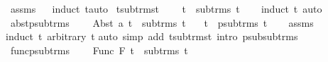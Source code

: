 \begin{isabellebody}
\isamarkupfalse%
\ assms\isanewline
\ \ \isamarkupfalse%
{\isacharparenleft}{\kern0pt}induct\ t{}{\isacharparenright}{\kern0pt}{\isacharparenleft}{\kern0pt}auto{\isacharparenright}{\kern0pt}%
\endisatagproof
{\isafoldproof}%
%
\isadelimproof
\isanewline
%
\endisadelimproof
\isanewline
\isanewline
{}\isamarkupfalse%
\ t{\isacharunderscore}{\kern0pt}sub{\isacharunderscore}{\kern0pt}trms{\isacharunderscore}{\kern0pt}t{\isacharcolon}{\kern0pt}\ \isanewline
\ \ \ {\isachardoublequoteopen}t\ {\isasymin}\ sub{\isacharunderscore}{\kern0pt}trms\ t{\isachardoublequoteclose}\isanewline
%
\isadelimproof
\ \ %
\endisadelimproof
%
\isatagproof
{}\isamarkupfalse%
\ {\isacharparenleft}{\kern0pt}induct\ t{\isacharparenright}{\kern0pt}\ {\isacharparenleft}{\kern0pt}auto{\isacharparenright}{\kern0pt}%
\endisatagproof
{\isafoldproof}%
%
\isadelimproof
\isanewline
%
\endisadelimproof
\isanewline
\isanewline
\isanewline
{}\isamarkupfalse%
\ abst{\isacharunderscore}{\kern0pt}psub{\isacharunderscore}{\kern0pt}trms{\isacharcolon}{\kern0pt}\ \isanewline
\ \ \ {\isachardoublequoteopen}Abst\ a\ t{}\ {\isasymin}\ sub{\isacharunderscore}{\kern0pt}trms\ t{}{\isachardoublequoteclose}\isanewline
\ \ \ {\isachardoublequoteopen}t{}\ {\isasymin}\ psub{\isacharunderscore}{\kern0pt}trms\ t{}{\isachardoublequoteclose}\isanewline
%
\isadelimproof
\ \ %
\endisadelimproof
%
\isatagproof
{}\isamarkupfalse%
\ assms\isanewline
{}\isamarkupfalse%
{\isacharparenleft}{\kern0pt}induct\ t{}\ arbitrary{\isacharcolon}{\kern0pt}\ t{}{\isacharparenright}{\kern0pt}\isanewline
{}\isamarkupfalse%
{\isacharparenleft}{\kern0pt}auto\ simp\ add{\isacharcolon}{\kern0pt}\ t{\isacharunderscore}{\kern0pt}sub{\isacharunderscore}{\kern0pt}trms{\isacharunderscore}{\kern0pt}t\ intro{\isacharcolon}{\kern0pt}\ psub{\isacharunderscore}{\kern0pt}sub{\isacharunderscore}{\kern0pt}trms{\isacharparenright}{\kern0pt}\isanewline
{}\isamarkupfalse%
%
\endisatagproof
{\isafoldproof}%
%
\isadelimproof
\isanewline
%
\endisadelimproof
\isanewline
{}\isamarkupfalse%
\ func{\isacharunderscore}{\kern0pt}psub{\isacharunderscore}{\kern0pt}trms{\isacharcolon}{\kern0pt}\ \isanewline
\ \ \ {\isachardoublequoteopen}Func\ F\ t{}\ {\isasymin}\ sub{\isacharunderscore}{\kern0pt}trms\ t{}{\isachardoublequoteclose}\isanewline

\end{isabellebody}
